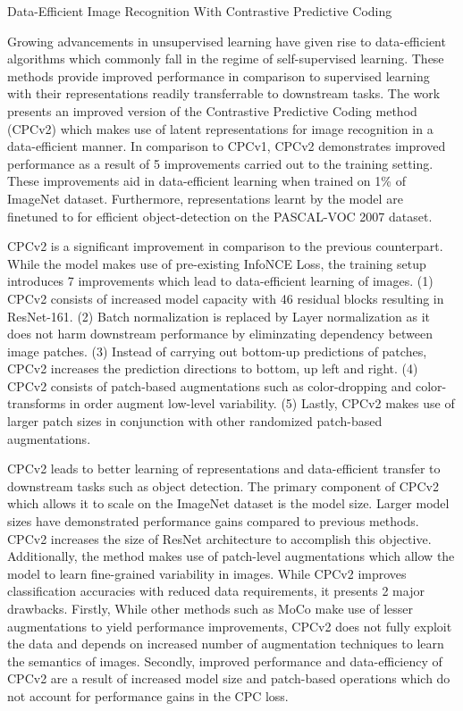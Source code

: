 \documentclass[11pt,letterpaper]{article}
\begin{document}
\begin{center}
  \large{Data-Efficient Image Recognition With Contrastive Predictive Coding}
\end{center}


Growing advancements in unsupervised learning have given rise to data-efficient algorithms which commonly fall in the regime of self-supervised learning. These methods provide improved performance in comparison to supervised learning with their representations readily transferrable to downstream tasks. The work presents an improved version of the Contrastive Predictive Coding method (CPCv2) which makes use of latent representations for image recognition in a data-efficient manner. In comparison to CPCv1, CPCv2 demonstrates improved performance as a result of 5 improvements carried out to the training setting. These improvements aid in data-efficient learning when trained on 1\% of ImageNet dataset. Furthermore, representations learnt by the model are finetuned to for efficient object-detection on the PASCAL-VOC 2007 dataset.

CPCv2 is a significant improvement in comparison to the previous counterpart. While the model makes use of pre-existing InfoNCE Loss, the training setup introduces 7 improvements which lead to data-efficient learning of images. (1) CPCv2 consists of increased model capacity with 46 residual blocks resulting in ResNet-161. (2) Batch normalization is replaced by Layer normalization as it does not harm downstream performance by eliminzating dependency between image patches. (3) Instead of carrying out bottom-up predictions of patches, CPCv2 increases the prediction directions to bottom, up left and right. (4) CPCv2 consists of patch-based augmentations such as color-dropping and color-transforms in order augment low-level variability. (5) Lastly, CPCv2 makes use of larger patch sizes in conjunction with other randomized patch-based augmentations.

CPCv2 leads to better learning of representations and data-efficient transfer to downstream tasks such as object detection. The primary component of CPCv2 which allows it to scale on the ImageNet dataset is the model size. Larger model sizes have demonstrated performance gains compared to previous methods. CPCv2 increases the size of ResNet architecture to accomplish this objective. Additionally, the method makes use of patch-level augmentations which allow the model to learn fine-grained variability in images. While CPCv2 improves classification accuracies with reduced data requirements, it presents 2 major drawbacks. Firstly, While other methods such as MoCo make use of lesser augmentations to yield performance improvements, CPCv2 does not fully exploit the data and depends on increased number of augmentation techniques to learn the semantics of images. Secondly, improved performance and data-efficiency of CPCv2 are a result of increased model size and patch-based operations which do not account for performance gains in the CPC loss.
\end{document}
